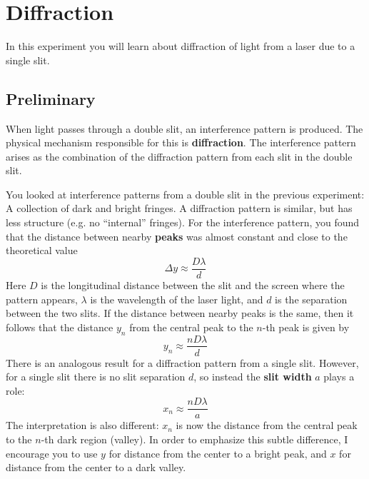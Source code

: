 \setcounter{chapter}{10}
\chapter{Diffraction}
%
In this experiment you will learn about diffraction of light from a laser due to a single slit.
%
\section{Preliminary}
%
When light passes through a double slit, an interference pattern is produced. The physical mechanism responsible for this is \textbf{diffraction}. The interference pattern arises as the combination of the diffraction pattern from each slit in the double slit.

You looked at interference patterns from a double slit in the previous experiment: A collection of dark and bright fringes. A diffraction pattern is similar, but has less structure (e.g. no ``internal'' fringes). For the interference pattern, you found that the distance between nearby \textbf{peaks} was almost constant and close to the theoretical value
\begin{equation}
    \Delta y \approx \frac{D \lambda}{d}
\end{equation}
Here $D$ is the longitudinal distance between the slit and the screen where the pattern appears, $\lambda$ is the wavelength of the laser light, and $d$ is the separation between the two slits. If the distance between nearby peaks is the same, then it follows that the distance $y_{n}$ from the central peak to the $n$-th peak is given by
\begin{equation}
    y_{n} \approx \frac{n D \lambda}{d}
\end{equation}
There is an analogous result for a diffraction pattern from a single slit. However, for a single slit there is no slit separation $d$, so instead the \textbf{slit width} $a$ plays a role:
\begin{equation}
    x_{n} \approx \frac{n D \lambda}{a}
\end{equation}
The interpretation is also different: $x_{n}$ is now the distance from the central peak to the $n$-th dark region (valley). In order to emphasize this subtle difference, I encourage you to use $y$ for distance from the center to a bright peak, and $x$ for distance from the center to a dark valley.
%
